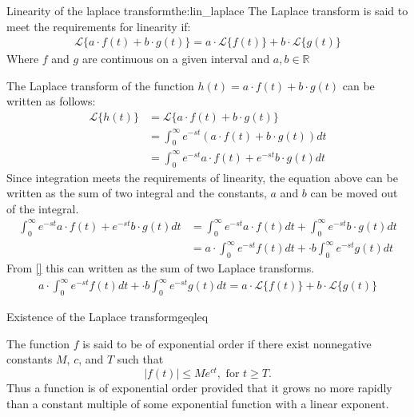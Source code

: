 \begin{theorem}{Linearity of the laplace transform}{the:lin_laplace}
The Laplace transform is said to meet the requirements for linearity if:
\begin{align}
\mathcal{L}\{a\cdot f(t)+b\cdot g(t)\}=a\cdot \mathcal{L}\{f(t)\}+b\cdot \mathcal{L}\{g(t)\}
\end{align}
Where $f$ and $g$ are continuous on a given interval and $a, b \in \mathbb{R}$
\end{theorem}
\begin{prof}{}{}
The Laplace transform of the function $h(t)=a\cdot f(t)+ b \cdot g(t)$ can be written as follows:
\begin{align}
\mathcal{L}\{h(t)\}&=\mathcal{L}\{a\cdot f(t)+b\cdot g(t)\}
\\
&=\int_{0}^\infty e^{-st}\left(a\cdot f(t)+b\cdot g(t)\right)dt
\\
&=\int_{0}^\infty e^{-st}a\cdot f(t)+e^{-st}b\cdot g(t)dt
\end{align}
Since integration meets the requirements of linearity, the equation above can be written as the sum of two integral and the constants, $a$ and $b$ can be moved out of the integral.
\begin{align}
\int_{0}^\infty e^{-st}a\cdot f(t)+e^{-st}b\cdot g(t)dt &=\int_{0}^\infty e^{-st}a\cdot f(t)dt+\int_{0}^\infty e^{-st}b\cdot g(t)dt
\\
&= a\cdot \int_{0}^\infty e^{-st} f(t)dt+\cdot b \int_{0}^\infty e^{-st} g(t)dt
\end{align}
From \ref{} this can written as the sum of two Laplace transforms.
\begin{align}
a\cdot \int_{0}^\infty e^{-st} f(t)dt+\cdot b \int_{0}^\infty e^{-st} g(t)dt =a\cdot \mathcal{L}\{f(t)\}+b\cdot \mathcal{L}\{g(t)\}
\end{align}
\end{prof}
\begin{theorem}{Existence of the Laplace transform}{geqleq}

The function $f$ is said to be of exponential order if there exist nonnegative constants $M$, $c$, and $T$  such that $$|f(t)| \leq Me^{ct},    \text{   for } t \geq T.$$
Thus a function is of exponential order provided that it grows no more rapidly than a constant multiple of some exponential function with a linear exponent. \cite[p. 320]{diffandcomplex}
\end{theorem}
